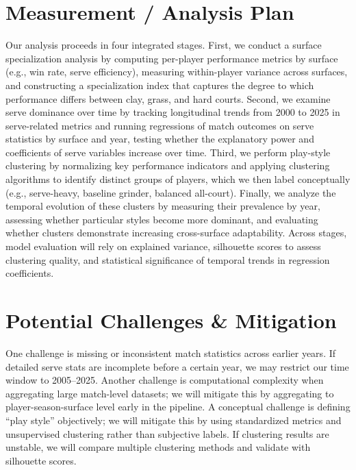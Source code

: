 \documentclass[12pt]{article}
\begin{document}
\section{Measurement / Analysis Plan}

{\color{black}
Our analysis proceeds in four integrated stages. First, we conduct a surface specialization analysis by computing per-player performance metrics by surface (e.g., win rate, serve efficiency), measuring within-player variance across surfaces, and constructing a specialization index that captures the degree to which performance differs between clay, grass, and hard courts. Second, we examine serve dominance over time by tracking longitudinal trends from 2000 to 2025 in serve-related metrics and running regressions of match outcomes on serve statistics by surface and year, testing whether the explanatory power and coefficients of serve variables increase over time. Third, we perform play-style clustering by normalizing key performance indicators and applying clustering algorithms to identify distinct groups of players, which we then label conceptually (e.g., serve-heavy, baseline grinder, balanced all-court). Finally, we analyze the temporal evolution of these clusters by measuring their prevalence by year, assessing whether particular styles become more dominant, and evaluating whether clusters demonstrate increasing cross-surface adaptability. Across stages, model evaluation will rely on explained variance, silhouette scores to assess clustering quality, and statistical significance of temporal trends in regression coefficients.
}

\section{Potential Challenges \& Mitigation}


{\color{black}
One challenge is missing or inconsistent match statistics across earlier years. If detailed serve stats are incomplete before a certain year, we may restrict our time window to 2005–2025. Another challenge is computational complexity when aggregating large match-level datasets; we will mitigate this by aggregating to player-season-surface level early in the pipeline. A conceptual challenge is defining “play style” objectively; we will mitigate this by using standardized metrics and unsupervised clustering rather than subjective labels. If clustering results are unstable, we will compare multiple clustering methods and validate with silhouette scores.
}
\end{document}
